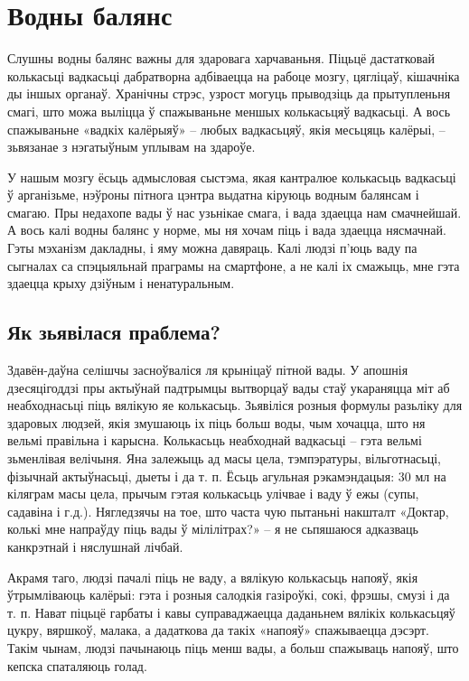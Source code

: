 \chapter{Водны балянс}

Слушны водны балянс важны для здаровага харчаваньня. Піцьцё дастатковай колькасьці вадкасьці дабратворна адбіваецца на рабоце мозгу, цягліцаў, кішачніка ды іншых органаў. Хранічны стрэс, узрост могуць прыводзіць да прытупленьня смагі, што можа выліцца ў спажываньне меншых колькасьцяў вадкасьці. А вось спажываньне «вадкіх калёрыяў» – любых вадкасьцяў, якія месьцяць калёрыі, – зьвязанае з нэгатыўным уплывам на здароўе.

У нашым мозгу ёсьць адмысловая сыстэма, якая кантралюе колькасьць вадкасьці ў арганізьме, нэўроны пітнога цэнтра выдатна кіруюць водным балянсам і смагаю. Пры недахопе вады ў нас узьнікае смага, і вада здаецца нам смачнейшай. А вось калі водны балянс у норме, мы ня хочам піць і вада здаецца нясмачнай. Гэты мэханізм дакладны, і яму можна давяраць. Калі людзі п'юць ваду па сыгналах са спэцыяльнай праграмы на смартфоне, а не калі іх смажыць, мне гэта здаецца крыху дзіўным і ненатуральным.

\section{Як зьявілася праблема?}

Здавён-даўна селішчы засноўваліся ля крыніцаў пітной вады. У апошнія дзесяцігоддзі пры актыўнай падтрымцы вытворцаў вады стаў укараняцца міт аб неабходнасьці піць вялікую яе колькасьць. Зьявіліся розныя формулы разьліку для здаровых людзей, якія змушаюць іх піць больш воды, чым хочацца, што ня вельмі правільна і карысна. Колькасьць неабходнай вадкасьці – гэта вельмі зьменлівая велічыня. Яна залежыць ад масы цела, тэмпэратуры, вільготнасьці, фізычнай актыўнасьці, дыеты і да т. п. Ёсьць агульная рэкамэндацыя: 30 мл на кіляграм масы цела, прычым гэтая колькасьць улічвае і ваду ў ежы (супы, садавіна і г.д.). Нягледзячы на тое, што часта чую пытаньні накшталт «Доктар, колькі мне напраўду піць вады ў мілілітрах?» – я не сьпяшаюся адказваць канкрэтнай і няслушнай лічбай.

Акрамя таго, людзі пачалі піць не ваду, а вялікую колькасьць напояў, якія ўтрымліваюць калёрыі: гэта і розныя салодкія газіроўкі, сокі, фрэшы, смузі і да т. п. Нават піцьцё гарбаты і кавы суправаджаецца даданьнем вялікіх колькасьцяў цукру, вяршкоў, малака, а дадаткова да такіх «напояў» спажываецца дэсэрт. Такім чынам, людзі пачынаюць піць менш вады, а больш спажываць напояў, што кепска спаталяюць голад.


